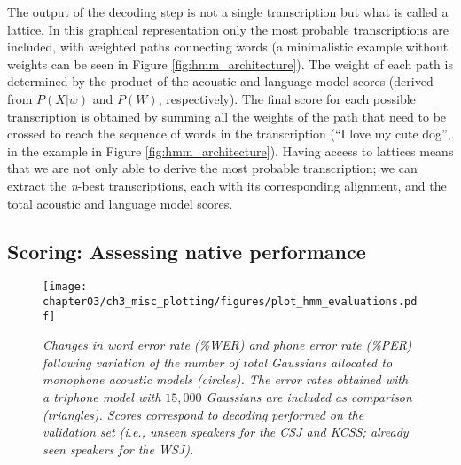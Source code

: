 The output of the decoding step is not a single transcription but what is called a lattice. In this graphical representation only the most probable transcriptions are included, with weighted paths connecting words (a minimalistic example without weights can be seen in Figure \ref{fig:hmm_architecture}). The weight of each path is determined by the product of the acoustic and language model scores (derived from $P(X|w)$ and $P(W)$, respectively). The final score for each possible transcription is obtained by summing all the weights of the path that need to be crossed to reach the sequence of words in the transcription (``I love my cute dog'', in the example in Figure \ref{fig:hmm_architecture}). Having access to lattices means that we are not only able to derive the most probable transcription; we can extract the \textit{n}-best transcriptions, each with its corresponding alignment, and the total acoustic and language model scores.   

\subsection{Scoring: Assessing native performance}

\begin{figure}[htb]
\centering
\texttt{[image: chapter03/ch3\_misc\_plotting/figures/plot\_hmm\_evaluations.pdf]}
\caption{\textit{Changes in word error rate (\%WER) and phone error rate (\%PER) following variation of the number of total Gaussians allocated to monophone acoustic models (circles). The error rates obtained with a triphone model with $15,000$ Gaussians are included as comparison (triangles). Scores correspond to decoding performed on the validation set (i.e., unseen speakers for the CSJ and KCSS; already seen speakers for the WSJ).}}
\label{fig:hmm_gaussians}
\end{figure}


